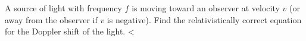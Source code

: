 A source of light with frequency $f$ is moving toward an
observer at velocity $v$ (or away from the observer if $v$ is
negative). Find the relativistically correct equation for
the Doppler shift of the light. 
<%
